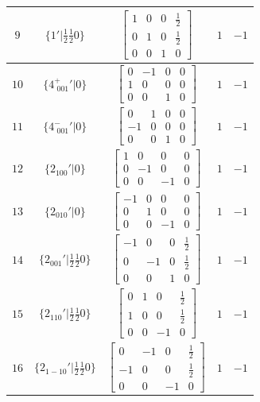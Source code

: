 \documentclass[fleqn,8pt]{jsarticle}
\begin{document}
\begin{longtable}{ccccc}
$ 9 $ & $ \{1{}'|\frac{1}{2} \frac{1}{2} 0\} $ & $ \begin{bmatrix} 1 & 0 & 0 & \frac{1}{2} \\ 0 & 1 & 0 & \frac{1}{2} \\ 0 & 0 & 1 & 0 \end{bmatrix} $ & $ 1 $ & $ -1 $ \\ \hline
$ 10 $ & $ \{4^{+}_{\,\,001}{}'|0\} $ & $ \begin{bmatrix} 0 & -1 & 0 & 0 \\ 1 & 0 & 0 & 0 \\ 0 & 0 & 1 & 0 \end{bmatrix} $ & $ 1 $ & $ -1 $ \\ \hline
$ 11 $ & $ \{4^{-}_{\,\,001}{}'|0\} $ & $ \begin{bmatrix} 0 & 1 & 0 & 0 \\ -1 & 0 & 0 & 0 \\ 0 & 0 & 1 & 0 \end{bmatrix} $ & $ 1 $ & $ -1 $ \\ \hline
$ 12 $ & $ \{2{}_{100}{}'|0\} $ & $ \begin{bmatrix} 1 & 0 & 0 & 0 \\ 0 & -1 & 0 & 0 \\ 0 & 0 & -1 & 0 \end{bmatrix} $ & $ 1 $ & $ -1 $ \\ \hline
$ 13 $ & $ \{2{}_{010}{}'|0\} $ & $ \begin{bmatrix} -1 & 0 & 0 & 0 \\ 0 & 1 & 0 & 0 \\ 0 & 0 & -1 & 0 \end{bmatrix} $ & $ 1 $ & $ -1 $ \\ \hline
$ 14 $ & $ \{2{}_{001}{}'|\frac{1}{2} \frac{1}{2} 0\} $ & $ \begin{bmatrix} -1 & 0 & 0 & \frac{1}{2} \\ 0 & -1 & 0 & \frac{1}{2} \\ 0 & 0 & 1 & 0 \end{bmatrix} $ & $ 1 $ & $ -1 $ \\ \hline
$ 15 $ & $ \{2{}_{110}{}'|\frac{1}{2} \frac{1}{2} 0\} $ & $ \begin{bmatrix} 0 & 1 & 0 & \frac{1}{2} \\ 1 & 0 & 0 & \frac{1}{2} \\ 0 & 0 & -1 & 0 \end{bmatrix} $ & $ 1 $ & $ -1 $ \\ \hline
$ 16 $ & $ \{2{}_{1-10}{}'|\frac{1}{2} \frac{1}{2} 0\} $ & $ \begin{bmatrix} 0 & -1 & 0 & \frac{1}{2} \\ -1 & 0 & 0 & \frac{1}{2} \\ 0 & 0 & -1 & 0 \end{bmatrix} $ & $ 1 $ & $ -1 $ \\
\end{longtable}
\end{document}
